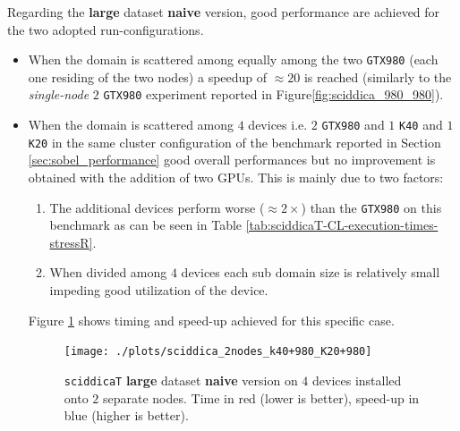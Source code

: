 Regarding the \textbf{large} dataset \textbf{naive} version, good performance are achieved for the two adopted run-configurations.
\begin{itemize}
\item When the domain is scattered among equally among the two \texttt{GTX980} (each one residing of the two nodes) a speedup of $\approx 20$ is reached (similarly to the \textit{single-node} $2$ \texttt{GTX980} experiment reported in Figure\ref{fig:sciddica_980_980}).
\item When the domain is scattered among $4$ devices i.e. $2$ \texttt{GTX980} and $1$ \texttt{K40} and $1$ \texttt{K20} in the same cluster configuration of the benchmark reported in Section \ref{sec:sobel_performance} good overall performances but no improvement is obtained with the addition of two GPUs.
This is mainly due to two factors: 
\begin{enumerate}[I]
\item The additional devices perform worse ($\approx 2 \times$) than the \texttt{GTX980} on this benchmark as can be seen in Table \ref{tab:sciddicaT-CL-execution-times-stressR}.
\item When divided among $4$ devices each sub domain size is relatively small impeding good utilization of the device. 
\end{enumerate}
Figure \ref{fig:sciddica_2nodes_k40+980_K20+980} shows timing and speed-up achieved for this specific case. 
\begin{figure}[!htb]
	\centering
	\texttt{[image: ./plots/sciddica\_2nodes\_k40+980\_K20+980]}
	\caption{\texttt{sciddicaT} \textbf{large} dataset \textbf{naive} version on $4$ devices installed onto $2$ separate nodes. Time in red (lower is better), speed-up in blue (higher is better).}
	\label{fig:sciddica_2nodes_k40+980_K20+980}
\end{figure}

\end{itemize}

